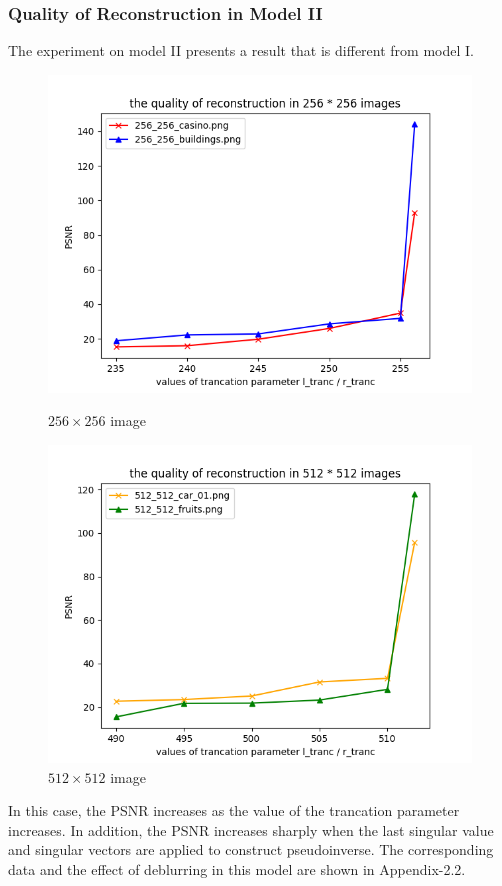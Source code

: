 \subsubsection{Quality of Reconstruction in Model II}
The experiment on model II presents a result that is different from model I. 
\begin{figure}[H]
    \centering
    \begin{minipage}[t]{0.45\linewidth} 
    \centering
    \includegraphics[width=\textwidth]{quality_256_model2.png}
    \caption{$256 \times 256$ image} 
    \end{minipage}
    \begin{minipage}[t]{0.45\linewidth}
    \centering 
    \includegraphics[width=\textwidth]{quality_512_model2.png}
    \caption{$512 \times 512$ image}
    \end{minipage}
\end{figure}
In this case, the PSNR increases as the value of the trancation parameter increases. In addition, the PSNR increases sharply when the last singular value and singular vectors are applied to construct pseudoinverse. The corresponding data and the effect of deblurring in this model are shown in Appendix-2.2.

